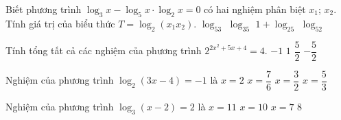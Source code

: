 \begin{ex}%
	Biết phương trình $\log_3 x-\log_5x\cdot\log_2x=0$ có hai nghiệm phân biệt $x_1$; $x_2$. Tính giá trị của biểu thức  $T=\log_2(x_1x_2)$.
	 \choice
		 {$\log_53$}
		{\True $\log_35$} 
		 {$1+\log_25$}
		 {$\log_52$}
\end{ex}

\begin{ex}%
	Tính tổng tất cả các nghiệm của phương trình  $2^{2x^2+5x+4}=4$.
	\choice 
		 {$-1$}
		{$1$} 
		 {$\dfrac{5}{2}$}
		{\True $-\dfrac{5}{2}$} 
\end{ex}

\begin{ex}%
	Nghiệm của phương  trình $\log_2(3x-4)=-1$ là
	 \choice
		{$x=2$} 
		 {$x=\dfrac{7}{6}$}
		{\True $x=\dfrac{3}{2}$} 
		 {$x=\dfrac{5}{3}$}
\end{ex}

\begin{ex}%
	Nghiệm của phương trình $\log_3  \left(x-2\right)=2$ là
	\choice 
		{\True$x=11$} 
		{$x=10$} 
		{$x=7$} 
		 {$8$}
\end{ex}

